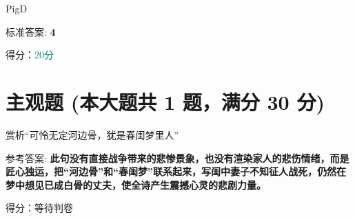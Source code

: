 \documentclass[12pt, a4paper, addpoints, answers]{exam}
\begin{document}
\begin{questions}
\question[20] PigD

\begin{oneparchoices}
\end{oneparchoices}

标准答案: \textbf{4}

得分：\textcolor{teal}{20分}

\end{questions}

\hspace{5cm}

\section{\normalsize{主观题 (本大题共 1 题，满分 30 分)}}
\hspace{1.5cm}

\begin{questions}
\question[30] 赏析“可怜无定河边骨，犹是春闺梦里人”


参考答案: \textbf{此句没有直接战争带来的悲惨景象，也没有渲染家人的悲伤情绪，而是匠心独运，把“河边骨”和“春闺梦”联系起来，写闺中妻子不知征人战死，仍然在梦中想见已成白骨的丈夫，使全诗产生震撼心灵的悲剧力量。}

得分：等待判卷   

\end{questions}
\end{document}
